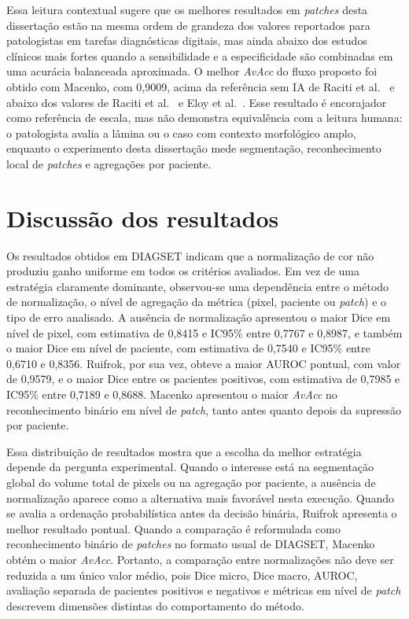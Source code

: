 Essa leitura contextual sugere que os melhores resultados em \textit{patches}
desta dissertação estão na mesma ordem de grandeza dos valores reportados para
patologistas em tarefas diagnósticas digitais, mas ainda abaixo dos estudos
clínicos mais fortes quando a sensibilidade e a especificidade são combinadas em
uma acurácia balanceada aproximada. O melhor \textit{AvAcc} do fluxo proposto
foi obtido com Macenko, com 0{,}9009, acima da referência sem IA de Raciti et
al.~\cite{raciti2020novel} e abaixo dos valores de Raciti et
al.~\cite{raciti2023clinical} e Eloy et al.~\cite{eloy2023artificial}. Esse
resultado é encorajador como referência de escala, mas não demonstra
equivalência com a leitura humana: o patologista avalia a lâmina ou o caso com
contexto morfológico amplo, enquanto o experimento desta dissertação mede
segmentação, reconhecimento local de \textit{patches} e agregações por paciente.

\section{Discussão dos resultados}\label{sec:res_diagset_discussao}

Os resultados obtidos em DIAGSET indicam que a normalização de cor não produziu ganho uniforme em todos os critérios avaliados. Em vez de uma estratégia claramente dominante, observou-se uma dependência entre o método de normalização, o nível de agregação da métrica (pixel, paciente ou \textit{patch}) e o tipo de erro analisado. A ausência de normalização apresentou o maior Dice em nível de pixel, com estimativa de 0{,}8415 e IC95\% entre 0{,}7767 e 0{,}8987, e também o maior Dice em nível de paciente, com estimativa de 0{,}7540 e IC95\% entre 0{,}6710 e 0{,}8356. Ruifrok, por sua vez, obteve a maior AUROC pontual, com valor de 0{,}9579, e o maior Dice entre os pacientes positivos, com estimativa de 0{,}7985 e IC95\% entre 0{,}7189 e 0{,}8688. Macenko apresentou o maior \textit{AvAcc} no reconhecimento binário em nível de \textit{patch}, tanto antes quanto depois da supressão por paciente.

Essa distribuição de resultados mostra que a escolha da melhor estratégia depende da pergunta experimental. Quando o interesse está na segmentação global do volume total de pixels ou na agregação por paciente, a ausência de normalização aparece como a alternativa mais favorável nesta execução. Quando se avalia a ordenação probabilística antes da decisão binária, Ruifrok apresenta o melhor resultado pontual. Quando a comparação é reformulada como reconhecimento binário de \textit{patches} no formato usual de DIAGSET, Macenko obtém o maior \textit{AvAcc}. Portanto, a comparação entre normalizações não deve ser reduzida a um único valor médio, pois Dice micro, Dice macro, AUROC, avaliação separada de pacientes positivos e negativos e métricas em nível de \textit{patch} descrevem dimensões distintas do comportamento do método.

